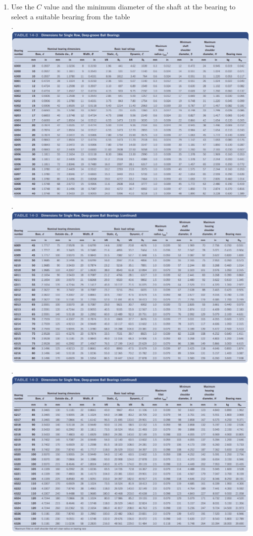 \documentclass[11pt, fleqn]{article}
\begin{document}
\begin{enumerate}
    \item Use the $C$ value and the minimum diameter of the shaft at the bearing to select a suitable bearing from the table\\
    .\hspace{-2cm}\includegraphics[scale=0.75]{Shafts/Tab14-3a.png}\\
    .\hspace{-2cm}\includegraphics[scale=0.75]{Shafts/Tab14-3b.png}\\
    .\hspace{-2cm}\includegraphics[scale=0.75]{Shafts/Tab14-3c.png}

\end{enumerate}
\end{document}
